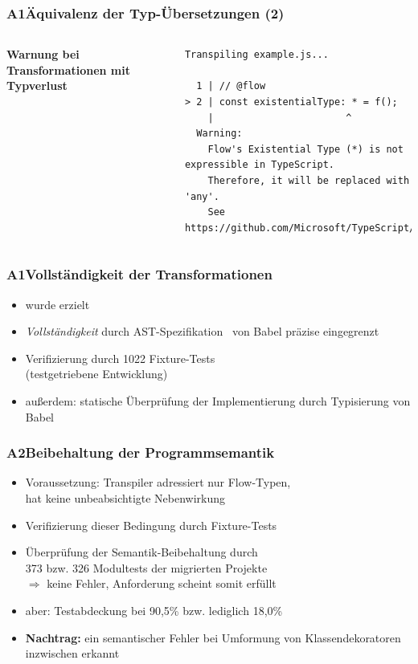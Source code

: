       \begin{frame}[fragile]
        \frametitle{A1\hspace{0.75em}Äquivalenz der Typ-Übersetzungen (2)}
        \begin{columns}
          \column{\dimexpr\paperwidth-16mm}
          \textbf{Warnung bei Transformationen mit Typverlust}
          \vspace{1.5em}
          \begin{lstlisting}[emph={Warning},numbers=none]
Transpiling example.js...

  1 | // @flow
> 2 | const existentialType: * = f();
    |                       ^
  Warning:
    Flow's Existential Type (*) is not expressible in TypeScript.
    Therefore, it will be replaced with 'any'.
    See https://github.com/Microsoft/TypeScript/issues/14466.
            \end{lstlisting}
        \end{columns}

      \end{frame}

      \begin{frame}
        \frametitle{A1\hspace{0.75em}Vollständigkeit der Transformationen}
        \begin{itemize}
          \item wurde erzielt
          \item \textit{Vollständigkeit} durch AST-Spezifikation~\autocite{BABEL:PARSER_SPEC} von Babel präzise eingegrenzt
          \item Verifizierung durch 1022 Fixture-Tests\\(testgetriebene Entwicklung)
          \item außerdem: statische Überprüfung der Implementierung durch Typisierung von Babel
        \end{itemize}
      \end{frame}

      \begin{frame}
        \frametitle{A2\hspace{0.75em}Beibehaltung der Programmsemantik}
          \begin{itemize}
            \item Voraussetzung: Transpiler adressiert nur Flow-Typen,\\hat keine unbeabsichtigte Nebenwirkung
            \item Verifizierung dieser Bedingung durch Fixture-Tests
            \item Überprüfung der Semantik-Beibehaltung durch\\373 bzw. 326 Modultests der migrierten Projekte\\
              \smallskip
              $\Rightarrow$ keine Fehler, Anforderung scheint somit erfüllt
            \item aber: Testabdeckung bei 90,5\% bzw. lediglich 18,0\%
            \item \textbf{Nachtrag:} ein semantischer Fehler bei Umformung von Klassendekoratoren inzwischen erkannt
          \end{itemize}
      \end{frame}

